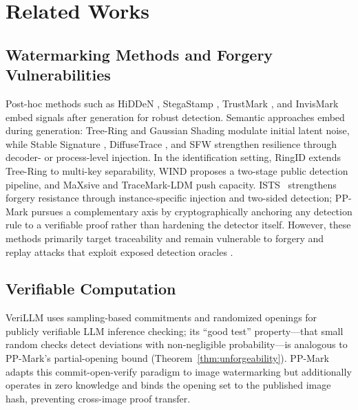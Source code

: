 \documentclass{article}
\theoremstyle{plain}
\theoremstyle{definition}
\theoremstyle{remark}
\begin{document}
\section{Related Works} 
\subsection{Watermarking Methods and Forgery Vulnerabilities}
Post-hoc methods such as HiDDeN \cite{zhu2018hidden}, StegaStamp \cite{tancik2020stegastamp}, TrustMark \cite{bui2023trustmark}, and InvisMark \cite{xu2024invismark} embed signals after generation for robust detection. Semantic approaches embed during generation: Tree-Ring \cite{wen2023treerings} and Gaussian Shading \cite{yang2024gaussianshading} modulate initial latent noise, while Stable Signature \cite{fernandez2023stablesignature}, DiffuseTrace \cite{lei2024diffusetrace}, and SFW \cite{lee2025iccv_sfw} strengthen resilience through decoder- or process-level injection. In the identification setting, RingID \cite{ci2024ringid} extends Tree-Ring to multi-key separability, WIND \cite{arabi2025wind} proposes a two-stage public detection pipeline, and MaXsive and TraceMark-LDM \cite{luo2025tracemarkldm,mao2025maxsive} push capacity. ISTS~\cite{zhong2024ists} strengthens forgery resistance through instance-specific injection and two-sided detection; PP-Mark pursues a complementary axis by cryptographically anchoring any detection rule to a verifiable proof rather than hardening the detector itself. However, these methods primarily target traceability and remain vulnerable to forgery and replay attacks that exploit exposed detection oracles \cite{jiang2023evading,muller2025blackbox}.

\subsection{Verifiable Computation}\label{sec:crypto-binding}
VeriLLM \cite{wang2025verillm} uses sampling-based commitments and randomized openings for publicly verifiable LLM inference checking; its ``good test'' property---that small random checks detect deviations with non-negligible probability---is analogous to PP-Mark's partial-opening bound (Theorem~\ref{thm:unforgeability}). PP-Mark adapts this commit-open-verify paradigm to image watermarking but additionally operates in zero knowledge and binds the opening set to the published image hash, preventing cross-image proof transfer.
\end{document}
